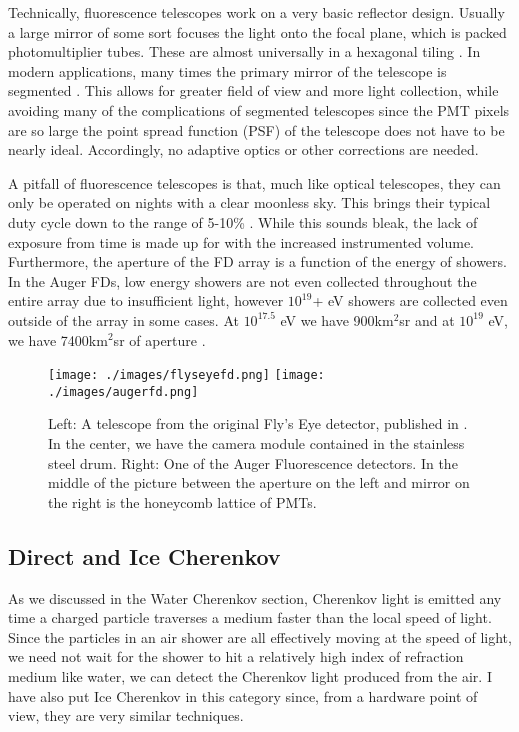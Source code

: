 Technically, fluorescence telescopes work on a very basic reflector design. Usually a large mirror of some sort focuses the light onto the focal plane, which is packed photomultiplier tubes. These are almost universally in a hexagonal tiling \cite{flyseye}. In modern applications, many times the primary mirror of the telescope is segmented \cite{fluorauger}. This allows for greater field of view and more light collection, while avoiding many of the complications of segmented telescopes since the PMT pixels are so large the point spread function (PSF) of the telescope does not have to be nearly ideal. Accordingly, no adaptive optics or other corrections are needed. 

A pitfall of fluorescence telescopes is that, much like optical telescopes, they can only be operated on nights with a clear moonless sky. This brings their typical duty cycle down to the range of 5-10\% \cite{flyseye,fluorauger,ultraray}. While this sounds bleak, the lack of exposure from time is made up for with the increased instrumented volume. Furthermore, the aperture of the FD array is a function of the energy of showers. In the Auger FDs, low energy showers are not even collected throughout the entire array due to insufficient light, however $10^{19}$+ eV showers are collected even outside of the array in some cases. At $10^{17.5}$ eV we have 900km$^2$sr and at $10^{19}$ eV, we have 7400km$^2$sr of aperture \cite{fluorauger}.
\begin{figure}[h!]
\begin{center}
\texttt{[image: ./images/flyseyefd.png]}
\texttt{[image: ./images/augerfd.png]}
\caption[Auger and Fly's Eye FDs]{Left: A telescope from the original Fly's Eye detector, published in \textcite{flyseye}. In the center, we have the camera module contained in the stainless steel drum. Right: One of the Auger Fluorescence detectors. In the middle of the picture between the aperture on the left and mirror on the right is the honeycomb lattice of PMTs.}
\label{fdpics}
\end{center}
\end{figure}
\subsection{Direct and Ice Cherenkov}
As we discussed in the Water Cherenkov section, Cherenkov light is emitted any time a charged particle traverses a medium faster than the local speed of light. Since the particles in an air shower are all effectively moving at the speed of light, we need not wait for the shower to hit a relatively high index of refraction medium like water, we can detect the Cherenkov light produced from the air. I have also put Ice Cherenkov in this category since, from a hardware point of view, they are very similar techniques.

